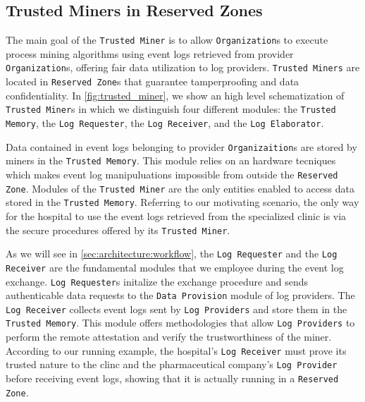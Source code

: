 \subsection{Trusted Miners in Reserved Zones}
The main goal of the \texttt{Trusted Miner} is to allow \texttt{Organization}s to execute process mining algorithms using %
event logs retrieved from provider \texttt{Organization}s, offering fair data utilization to log providers. \texttt{Trusted Miners} are located in \texttt{Reserved Zone}s that guarantee tamperproofing and data confidentiality. In \cref{fig:trusted_miner}, we show an high level schematization of \texttt{Trusted Miner}s in which we distinguish four different modules: the \texttt{Trusted Memory}, the \texttt{Log Requester}, the \texttt{Log Receiver}, and the \texttt{Log Elaborator}.

Data contained in event logs belonging to provider \texttt{Organizaition}s are stored by miners in the \texttt{Trusted Memory}. This module relies on an hardware tecniques which makes event log manipuluations impossible from outside the \texttt{Reserved Zone}. Modules of the \texttt{Trusted Miner} are the only entities enabled to access data stored in the \texttt{Trusted Memory}. Referring to our motivating scenario, the only way for the hospital to use the event logs retrieved from the specialized clinic is via the secure procedures offered by its \texttt{Trusted Miner}.

As we will see in \cref{sec:architecture:workflow}, the \texttt{Log Requester} and the \texttt{Log Receiver} are the fundamental modules that we employee during the event log exchange. \texttt{Log Requester}s initalize the exchange procedure and sends authenticable data requests to the \texttt{Data Provision} module of log providers. The \texttt{Log Receiver} collects event logs sent by \texttt{Log Providers} and store them in the \texttt{Trusted Memory}. This module offers methodologies that allow \texttt{Log Providers} to perform the remote attestation and verify the trustworthiness of the miner. According to our running example, the hospital's \texttt{Log Receiver} must prove its trusted nature to the clinc and the pharmaceutical company's \texttt{Log Provider} before receiving event logs, showing that it is actually running in a \texttt{Reserved Zone}.

